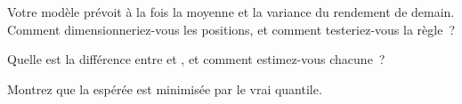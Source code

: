 \begin{interviewq}\label{iq:ml:probabilistic-models-and-uncertainty:4}
Votre modèle prévoit à la fois la moyenne et la variance du rendement de demain. Comment dimensionneriez-vous les positions, et comment
testeriez-vous la règle~?
\end{interviewq}

\begin{interviewq}\label{iq:ml:probabilistic-models-and-uncertainty:5}
Quelle est la différence entre  et , et comment estimez-vous chacune~?
\end{interviewq}

\begin{interviewq}\label{iq:ml:probabilistic-models-and-uncertainty:6}
Montrez que la  espérée est minimisée par le vrai quantile.
\end{interviewq}
